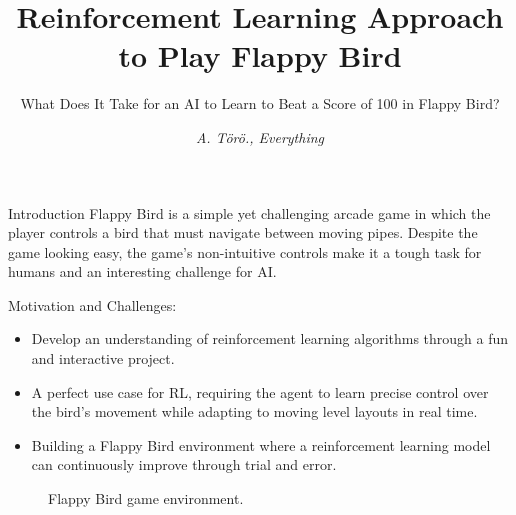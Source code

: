 \documentclass[final,hyperref={pdfpagelabels=false}]{beamer}
\title{Reinforcement Learning Approach to Play Flappy Bird}
\subtitle{What Does It Take for an AI to Learn to Beat a Score of 100 in Flappy Bird?}
\author{
    \textit{A. T\"or\"o., Everything}
}
\begin{document}
\begin{frame}
\begin{cvprlposter}

\begin{block}{Introduction}
Flappy Bird is a simple yet challenging arcade game in which the player controls a bird that must navigate between moving pipes. Despite the game looking easy, the game's non-intuitive controls make it a tough task for humans and an interesting challenge for AI.

Motivation and Challenges:
\begin{itemize}
    \item Develop an understanding of reinforcement learning algorithms through a fun and interactive project.
    \item A perfect use case for RL, requiring the agent to learn precise control over the bird's movement while adapting to moving level layouts in real time.
    \item Building a Flappy Bird environment where a reinforcement learning model can continuously improve through trial and error.
\end{itemize}


\begin{figure}[ht]
    \centering
    \caption{Flappy Bird game environment.}
    \label{fig:problem}
\end{figure}
\end{block}


\end{cvprlposter}
\end{frame}
\end{document}
